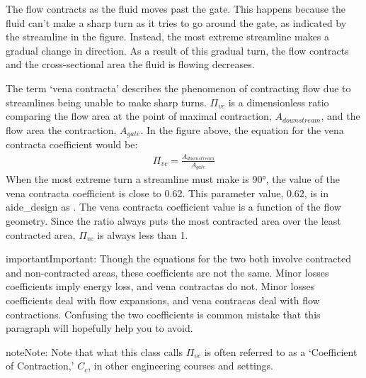 \documentclass[letterpaper,10pt,english]{sphinxmanual}
\begin{document}
The flow contracts as the fluid moves past the gate. This happens because the fluid can’t make a sharp turn as it tries to go around the gate, as indicated by the streamline in the figure. Instead, the most extreme streamline makes a gradual change in direction. As a result of this gradual turn, the flow contracts and the cross-sectional area the fluid is flowing decreases.

The term ‘vena contracta’ describes the phenomenon of contracting flow due to streamlines being unable to make sharp turns. \(\Pi_{vc}\) is a dimensionless ratio comparing the flow area at the point of maximal contraction, \(A_{downstream}\), and the flow area  the contraction, \(A_{gate}\). In the figure above, the equation for the vena contracta coefficient would be:
\begin{equation}\label{equation:Review/Review_Fluid_Mechanics:Review/Review_Fluid_Mechanics:23}
\begin{split}\Pi_{vc} = \frac{A_{downstream}}{A_{gate}}\end{split}
\end{equation}
When the most extreme turn a streamline must make is 90°, the value of the vena contracta coefficient is close to 0.62. This parameter value, 0.62, is in aide\_design as . The vena contracta coefficient value is a function of the flow geometry. Since the ratio always puts the most contracted area over the least contracted area, \(\Pi_{vc}\) is always less than 1.

\begin{sphinxadmonition}{important}{Important:}
 Though the equations for the two both involve contracted and non-contracted areas, these coefficients are not the same. Minor losses coefficients imply energy loss, and vena contractas do not. Minor losses coefficients deal with flow expansions, and vena contracas deal with flow contractions. Confusing the two coefficients is common mistake that this paragraph will hopefully help you to avoid.
\end{sphinxadmonition}

\begin{sphinxadmonition}{note}{Note:}
Note that what this class calls \(\Pi_{vc}\) is often referred to as a ‘Coefficient of Contraction,’ \(C_c\), in other engineering courses and settings.
\end{sphinxadmonition}
\end{document}
